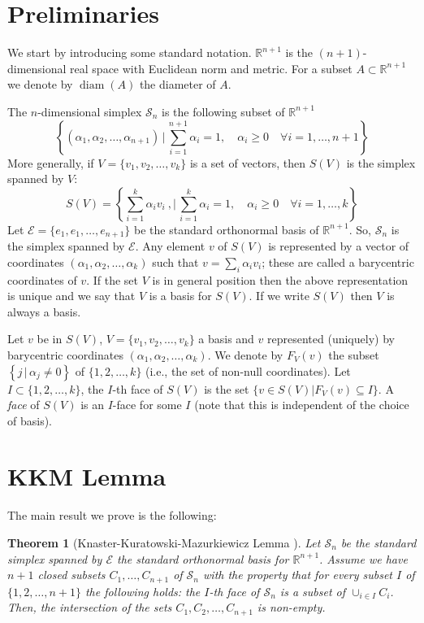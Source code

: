 \documentclass[12pt]{article}
\newtheorem{theorem}{Theorem}
\DeclareMathOperator{\diam}{diam}
\begin{document}
\section{Preliminaries}
We start by introducing some standard notation. $\mathbb{R}^{n+1}$
is the $(n+1)$-dimensional real space with Euclidean norm and
metric. For a subset $A\subset \mathbb{R}^{n+1}$ we denote by
$\diam(A)$ the diameter of $A$.

The $n$-dimensional simplex $\mathcal{S}_n$ is the following
subset of $\mathbb{R}^{n+1}$
\[
\left\{(\alpha_1,\alpha_2,\ldots,\alpha_{n+1}) \, \Big| \,
\sum_{i=1}^{n+1}\alpha_i=1, \quad \alpha_i\geq0 \quad \forall
i=1,\ldots,n+1\right\}
\]
More generally, if $V=\{v_1,v_2,\ldots,v_k\}$ is a set of vectors,
then $S(V)$ is the simplex spanned by $V$:
\[
S(V)=\left\{\sum_{i=1}^k\alpha_i v_i\ ,\Big|\,
\sum_{i=1}^k\alpha_i=1, \quad \alpha_i\geq0 \quad \forall
i=1,\ldots,k\right\}
\]
Let $\mathcal{E}=\{e_1,e_1,\ldots,e_{n+1}\}$ be the standard
orthonormal basis of $\mathbb{R}^{n+1}$. So, $\mathcal{S}_n$ is
the simplex spanned by $\mathcal{E}$. Any element $v$ of $S(V)$ is
represented by a vector of coordinates
$(\alpha_1,\alpha_2,\ldots,\alpha_k)$ such that $v=\sum_i\alpha_i
v_i$; these are called a barycentric coordinates of $v$. If the
set $V$ is in general position then the above representation is
unique and we say that $V$ is a basis for $S(V)$. If we write
$S(V)$ then $V$ is always a basis.

Let $v$ be in $S(V)$, $V=\{v_1,v_2,\ldots,v_k\}$ a basis and $v$
represented (uniquely) by barycentric coordinates
$(\alpha_1,\alpha_2,\ldots,\alpha_k)$. We denote by $F_V(v)$ the
subset $\left\{j \,|\, \alpha_j \neq 0 \right\}$ of
$\{1,2,\ldots,k\}$ (i.e., the set of non-null coordinates). Let
$I\subset \{1,2,\ldots,k\}$, the $I$-th face of $S(V)$ is the set
$\{v\in S(V)|F_V(v) \subseteq I\}$. A \emph{face} of $S(V)$ is an
$I$-face for some $I$ (note that this is independent of the choice
of basis).

\section{KKM Lemma}

The main result we prove is the following:

\begin{theorem}[Knaster-Kuratowski-Mazurkiewicz Lemma \cite{KKM}]
Let $\mathcal{S}_n$ be the standard simplex spanned by
$\mathcal{E}$ the standard orthonormal basis for
$\mathbb{R}^{n+1}$. Assume we have $n+1$ closed subsets
$C_1,\ldots,C_{n+1}$ of $\mathcal{S}_n$ with the property that for
every subset $I$ of $\{1,2,\ldots,n+1\}$ the following holds: the
$I$-th face of $\mathcal{S}_n$ is a subset of $\cup_{i\in I}C_i$.
Then, the intersection of the sets $C_1,C_2,\ldots,C_{n+1}$ is
non-empty.
\end{theorem}
\end{document}
